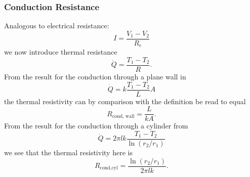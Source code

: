 \subsubsection{Conduction Resistance}
Analogous to electrical resistance:
\begin{equation*}
  I = \frac{V_1 - V_2}{R_e}
\end{equation*}
we now introduce thermal resistance
\begin{equation*}
  \dot{Q} = \frac{T_1 - T_2}{R}
.\end{equation*}
From the result for the conduction through a plane wall in 
\begin{equation*}
  \dot{Q} = k \frac{T_1 - T_2}{L}A
\end{equation*}
the thermal resistivity can by comparison with the definition be read to equal
\begin{equation*}
  R_{\text{cond, wall}} = \frac{L}{kA}
.\end{equation*}
From the result for the conduction through a cylinder from 
\begin{equation*}
  \dot{Q} = 2 \pi l k \frac{T_1 - T_2}{\ln (r_2/r_1)}
\end{equation*}
we see that the thermal resistivity here is
\begin{equation*}
  R_{\text{cond,cyl}} = \frac{\ln (r_2/r_1)}{2\pi l k}
.\end{equation*}

